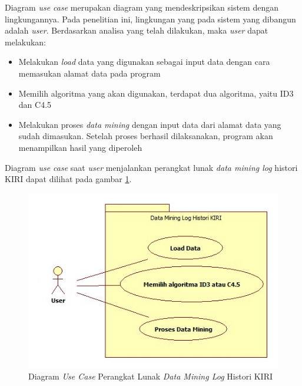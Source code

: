 Diagram \textsl{use case} merupakan diagram yang mendeskripsikan sistem dengan lingkungannya. Pada penelitian ini, lingkungan yang pada sistem yang dibangun adalah \textsl{user}. Berdasarkan analisa yang telah dilakukan, maka \textsl{user} dapat melakukan:
\begin{itemize}
	\item Melakukan \textsl{load} data yang digunakan sebagai input data dengan cara memasukan alamat data pada program
	\item Memilih algoritma yang akan digunakan, terdapat dua algoritma, yaitu ID3 dan C4.5
	\item Melakukan proses \textsl{data mining} dengan input data dari alamat data yang sudah dimasukan. Setelah proses berhasil dilaksanakan, program akan menampilkan hasil yang diperoleh
\end{itemize}

Diagram \textsl{use case} saat \textsl{user} menjalankan perangkat lunak \textsl{data mining log} histori KIRI dapat dilihat pada gambar \ref{fig:diagramUseCase}.

\begin{figure}[H]
\includegraphics[scale=1]{Gambar/usecase.jpg}
\caption[Diagram \textsl{Use Case} Perangkat Lunak \textsl{Data Mining Log} Histori KIRI]{Diagram \textsl{Use Case} Perangkat Lunak \textsl{Data Mining Log} Histori KIRI} 
\label{fig:diagramUseCase}
\end{figure}

